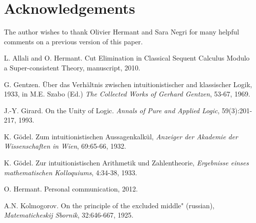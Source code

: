 \documentclass{article}
\begin{document}
\section*{Acknowledgements}

The author wishes to thank Olivier Hermant and Sara Negri for many
helpful comments on a previous version of this paper.


\begin{thebibliography}{99.}

L. Allali and O. Hermant.
Cut Elimination in Classical Sequent Calculus
Modulo a Super-consistent Theory, manuscript, 2010.

 G. Gentzen. \"Uber das Verh\"altnis zwischen
intuitionistischer and klassischer Logik, 1933, in M.E. Szabo (Ed.)
{\em The Collected Works of Gerhard Gentzen}, 53-67, 1969.

J.-Y. Girard. On the Unity of Logic. {\em Annals of Pure and Applied Logic},
59(3):201-217, 1993.

K. G\"odel.  Zum intuitionistischen Aussagenkalk\"ul,
{\em Anzeiger der Akademie der Wissenschaften in Wien}, 69:65-66,
1932.

K. G\"odel.
Zur intuitionistischen Arithmetik und Zahlentheorie, {\em Ergebnisse einses
mathematischen Kolloquiums}, 4:34-38, 1933.

O. Hermant. Personal communication, 2012.

A.N. Kolmogorov. On the principle of the excluded
middle" (russian), {\em Matematicheskij Sbornik}, 32:646-667, 1925.
\end{thebibliography}
\end{document}
